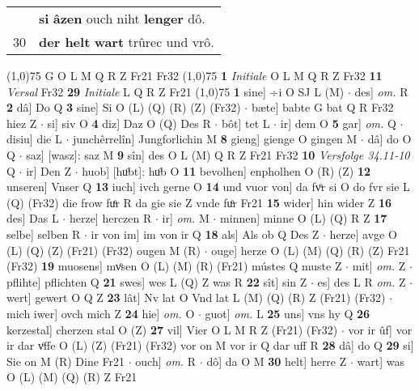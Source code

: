 \documentclass[8pt,a4paper,notitlepage]{article}
\begin{document}
\begin{table}[ht]
\begin{minipage}[t]{0.5\linewidth}
\begin{tabular}{rl}
 & \textbf{si} \textbf{âzen} ouch niht \textbf{lenger} dô.\\ 
30 & \textbf{der helt} \textbf{wart} trûrec und vrô.\\ 
\end{tabular}
\scriptsize
\line(1,0){75} \newline
G O L M Q R Z Fr21 Fr32 \newline
\line(1,0){75} \newline
\textbf{1} \textit{Initiale} O L M Q R Z Fr32  \textbf{11} \textit{Versal} Fr32  \textbf{29} \textit{Initiale} L Q R Z Fr21  \newline
\line(1,0){75} \newline
\textbf{1} sine] ÷i O SJ L (M)  $\cdot$ des] \textit{om.} R \textbf{2} dâ] Do Q \textbf{3} sine] Si O (L) (Q) (R) (Z) (Fr32)  $\cdot$ bæte] babte G bat Q R Fr32 hiez Z  $\cdot$ si] siv O \textbf{4} diz] Daz O (Q) Des R  $\cdot$ bôt] tet L  $\cdot$ ir] dem O \textbf{5} gar] \textit{om.} Q  $\cdot$ disiu] die L  $\cdot$ junchêrrelîn] Jungforlichin M \textbf{8} gieng] gienge O gingen M  $\cdot$ dâ] do O Q  $\cdot$ saz] [wasz]: saz M \textbf{9} sîn] des O L (M) Q R Z Fr21 Fr32 \textbf{10} \textit{Versfolge 34.11-10} Q   $\cdot$ ir] Den Z  $\cdot$ huob] [huͦbt]: huͦb O \textbf{11} bevolhen] enpholhen O (R) (Z) \textbf{12} unseren] Vnser Q \textbf{13} iuch] ivch gerne O \textbf{14} und vuor von] da fvͦr si O do fvr sie L (Q) (Fr32) die frow fuͦr R da gie sie Z vnde fuͦr Fr21 \textbf{15} wider] hin wider Z \textbf{16} des] Das L  $\cdot$ herze] herczen R  $\cdot$ ir] \textit{om.} M  $\cdot$ minnen] minne O (L) (Q) R Z \textbf{17} selbe] selben R  $\cdot$ ir von im] im von ir Q \textbf{18} als] Als ob Q Des Z  $\cdot$ herze] avge O (L) (Q) (Z) (Fr21) (Fr32) ougen M (R)  $\cdot$ ouge] herze O (L) (M) (Q) (R) (Z) Fr21 (Fr32) \textbf{19} muosens] mvͦsen O (L) (M) (R) (Fr21) mústes Q muste Z  $\cdot$ mit] \textit{om.} Z  $\cdot$ pflihte] pflichten Q \textbf{21} swes] wes L (Q) Z was R \textbf{22} sît] sin Z  $\cdot$ es] des L R \textit{om.} Z  $\cdot$ wert] gewert O Q Z \textbf{23} lât] Nv lat O Vnd lat L (M) (Q) (R) Z (Fr21) (Fr32)  $\cdot$ mich iwer] ovch mich Z \textbf{24} hie] \textit{om.} O  $\cdot$ guot] \textit{om.} L \textbf{25} uns] vns hy Q \textbf{26} kerzestal] cherzen stal O (Z) \textbf{27} vil] Vier O L M R Z (Fr21) (Fr32)  $\cdot$ vor ir ûf] vor ir dar vͦffe O (L) (Z) (Fr21) (Fr32) vor on M vor ir Q dar uff R \textbf{28} dâ] do Q \textbf{29} si] Sie on M (R) Dine Fr21  $\cdot$ ouch] \textit{om.} R  $\cdot$ dô] da O M \textbf{30} helt] herre Z  $\cdot$ wart] was O (L) (M) (Q) (R) Z Fr21 \newline

\end{minipage}
\end{table}
\end{document}
